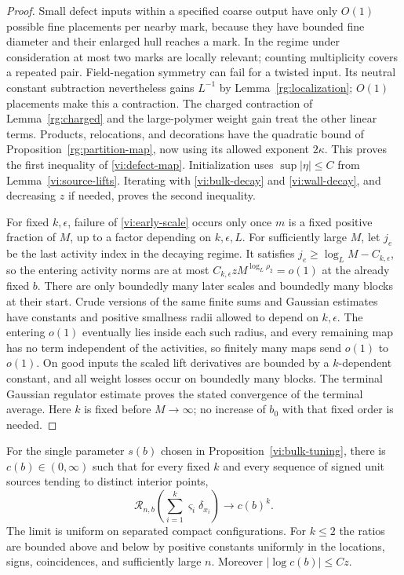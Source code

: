 \begin{proof}
Small defect inputs within a specified coarse output have only $O(1)$
possible fine placements per nearby mark, because they have bounded fine
diameter and their enlarged hull reaches a mark.  In the regime under
consideration at most two marks are locally relevant; counting
multiplicity covers a repeated pair.  Field-negation symmetry can fail
for a twisted input.  Its neutral constant subtraction nevertheless
gains $L^{-1}$ by Lemma~\ref{rg:localization}; $O(1)$ placements make
this a contraction.  The charged contraction of
Lemma~\ref{rg:charged} and the large-polymer weight gain treat the other
linear terms.  Products, relocations, and decorations have the quadratic
bound of Proposition~\ref{rg:partition-map}, now using its allowed exponent
$2\kappa$.  This proves the first inequality of \eqref{vi:defect-map}.
Initialization uses $\sup|\eta|\le C$ from
Lemma~\ref{vi:source-lifts}.  Iterating with
\eqref{vi:bulk-decay} and \eqref{vi:wall-decay}, and decreasing $z$ if
needed, proves the second inequality.

For fixed $k,\epsilon$, failure of \eqref{vi:early-scale} occurs only
once $m$ is a fixed positive fraction of $M$, up to a factor depending
on $k,\epsilon,L$.  For sufficiently large $M$, let $j_e$ be the last
activity index in the decaying regime.  It satisfies
$j_e\ge\log_L M-C_{k,\epsilon}$, so the entering activity norms are
at most $C_{k,\epsilon}zM^{\log_L\rho_2}=o(1)$ at the already fixed
$b$.  There are only boundedly many later scales and boundedly many
blocks at their start.  Crude versions of the same finite sums and
Gaussian estimates have constants and positive smallness radii allowed
to depend on $k,\epsilon$.  The entering $o(1)$ eventually lies inside
each such radius, and every remaining map has no term independent of
the activities, so finitely many maps send $o(1)$ to $o(1)$.  On good inputs the
scaled lift derivatives are bounded by a $k$-dependent constant, and
all weight losses occur on boundedly many blocks.  The terminal Gaussian
regulator estimate proves the stated convergence of the terminal average.
Here $k$ is fixed before $M\to\infty$; no increase of $b_0$ with that
fixed order is needed.
\end{proof}

\begin{proposition}\label{vi:amplitude}
For the single parameter $s(b)$ chosen in
Proposition~\ref{vi:bulk-tuning}, there is $c(b)\in(0,\infty)$ such that
for every fixed $k$ and every sequence of signed unit sources tending to
distinct interior points,
\begin{equation}
 \mathcal R_{n,b}\!\left(\sum_{i=1}^k\varsigma_i\delta_{x_i}\right)
             \longrightarrow c(b)^k.                    \label{vi:ratio-limit}
\end{equation}
The limit is uniform on separated compact configurations.  For $k\le2$
the ratios are bounded above and below by positive constants uniformly
in the locations, signs, coincidences, and sufficiently large $n$.
Moreover $|\log c(b)|\le Cz$.
\end{proposition}

